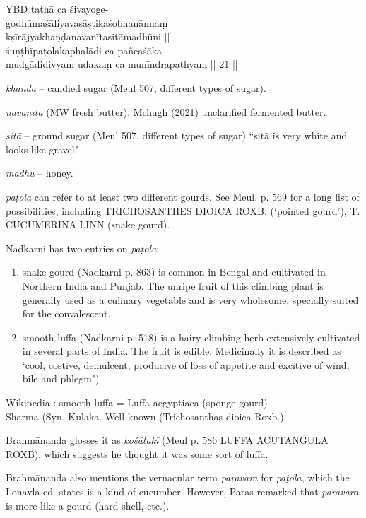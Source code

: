 \begin{ekdosis}
\begin{testimonia}[hp01_062]
YBD
\startverse
tathā ca śivayoge-\\
godhūmaśāliyavaṣāṣṭikaśobhanānnaṃ \\
kṣīrājyakhaṇḍanavanītasitāmadhūni ||\\
śuṇṭhīpaṭolakaphalādi ca pañcaśāka-\\
mudgādidivyam udakaṃ ca munīndrapathyam || 21 ||
\endverse
\end{testimonia}

\begin{philcomm}[hp01_062]
\emph{khaṇḍa} -- candied sugar (Meul 507, different types of sugar).

\emph{navanīta} (MW fresh butter), Mchugh (2021) unclarified fermented butter.

\emph{sitā} -- ground sugar (Meul 507, different types of sugar) ``sitā is very white and looks like gravel"

\emph{madhu} -- honey.

\emph{paṭola} can refer to at least two different gourds. See Meul. p. 569 for a long list of possibilities, including TRICHOSANTHES DIOICA ROXB. (`pointed gourd'), T. CUCUMERINA LINN (snake gourd).

Nadkarni has two entries on \emph{paṭola}:
\begin{enumerate}
\item snake gourd (Nadkarni p. 863) is common in Bengal and cultivated in Northern India and Punjab. The unripe fruit of this climbing plant is generally used as a culinary vegetable and is very wholesome, specially suited for the convalescent.

\item smooth luffa (Nadkarni p. 518) is a hairy climbing herb extensively cultivated in several parts of India. The fruit is edible. Medicinally it is described as `cool, costive, demulcent, producive of loss of appetite and excitive of wind, bile and phlegm")
\end{enumerate}

Wikipedia : smooth luffa = Luffa aegyptiaca (sponge gourd)\\
Sharma (Syn. Kulaka. Well known (Trichosanthas dioica Roxb.)

Brahmānanda glosses it as \emph{kośātakī} (Meul p. 586 LUFFA ACUTANGULA ROXB), which suggests he thought it was some sort of luffa.

Brahmānanda also mentions the vernacular term \emph{paravara} for \emph{paṭola}, which the Lonavla ed. states is a kind of cucumber. However, Paras remarked that \emph{paravara} is more like a gourd (hard shell, etc.).


\end{philcomm}
\end{ekdosis}
